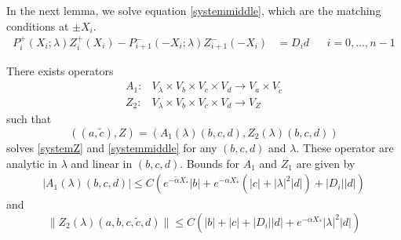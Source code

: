 \documentclass[thesis.tex]{subfiles}
\begin{document}
In the next lemma, we solve equation \eqref{systemmiddle}, which are the matching conditions at $\pm X_i$.
\begin{align*}
P_i^+(X_i; \lambda) Z_i^+(X_i) - P_{i+1}^-(-X_i; \lambda) Z_{i+1}^-(-X_i) &= D_i d && i = 0, \dots, n-1
\end{align*}

\begin{lemma}\label{Zinv1}
There exists operators
\begin{align*}
A_1: &V_\lambda \times V_b \times V_c \times V_d \rightarrow V_a \times V_{\tilde{c}} \\
Z_2: &V_\lambda \times V_b \times V_c \times V_d \rightarrow V_Z
\end{align*}
such that 
\[
((a, \tilde{c}), Z) = (A_1(\lambda)(b, c, d), Z_2(\lambda)(b,c,d))
\]
solves \eqref{systemZ} and \eqref{systemmiddle} for any $(b, c, d)$ and $\lambda$. These operator are analytic in $\lambda$ and linear in $(b, c, d)$. Bounds for $A_1$ and $Z_1$ are given by
\begin{align}\label{A1bound}
|A_1(\lambda)(b, c, d)| \leq C \left( e^{-\tilde{\alpha} X_*} |b|  + e^{-\alpha X_*}(|c| + |\lambda|^2 |d|) + |D_i||d| \right)
\end{align} 
and
\begin{equation}\label{Z2bound}
\| Z_2(\lambda)(a,b,c,\tilde{c},d) \| \leq C\left(|b| + |c| + |D_i||d| + e^{-\alpha X_*}|\lambda|^2|d|\right)
\end{equation}


\end{lemma}
\end{document}
